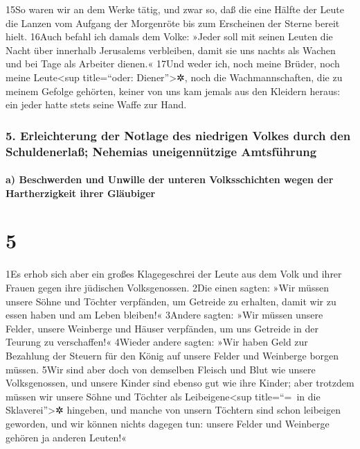 15So waren wir an dem Werke tätig, und zwar so, daß die eine Hälfte der
Leute die Lanzen vom Aufgang der Morgenröte bis zum Erscheinen der
Sterne bereit hielt. 16Auch befahl ich damals dem Volke: »Jeder soll mit
seinen Leuten die Nacht über innerhalb Jerusalems verbleiben, damit sie
uns nachts als Wachen und bei Tage als Arbeiter dienen.« 17Und weder
ich, noch meine Brüder, noch meine Leute\textless sup title=``oder:
Diener''\textgreater✲, noch die Wachmannschaften, die zu meinem Gefolge
gehörten, keiner von uns kam jemals aus den Kleidern heraus: ein jeder
hatte stets seine Waffe zur Hand.

\hypertarget{erleichterung-der-notlage-des-niedrigen-volkes-durch-den-schuldenerlauxdf-nehemias-uneigennuxfctzige-amtsfuxfchrung}{%
\subsubsection{5. Erleichterung der Notlage des niedrigen Volkes durch
den Schuldenerlaß; Nehemias uneigennützige
Amtsführung}\label{erleichterung-der-notlage-des-niedrigen-volkes-durch-den-schuldenerlauxdf-nehemias-uneigennuxfctzige-amtsfuxfchrung}}

\hypertarget{a-beschwerden-und-unwille-der-unteren-volksschichten-wegen-der-hartherzigkeit-ihrer-gluxe4ubiger}{%
\paragraph{a) Beschwerden und Unwille der unteren Volksschichten wegen
der Hartherzigkeit ihrer
Gläubiger}\label{a-beschwerden-und-unwille-der-unteren-volksschichten-wegen-der-hartherzigkeit-ihrer-gluxe4ubiger}}

\hypertarget{section-4}{%
\section{5}\label{section-4}}

1Es erhob sich aber ein großes Klagegeschrei der Leute aus dem Volk und
ihrer Frauen gegen ihre jüdischen Volksgenossen. 2Die einen sagten: »Wir
müssen unsere Söhne und Töchter verpfänden, um Getreide zu erhalten,
damit wir zu essen haben und am Leben bleiben!« 3Andere sagten: »Wir
müssen unsere Felder, unsere Weinberge und Häuser verpfänden, um uns
Getreide in der Teurung zu verschaffen!« 4Wieder andere sagten: »Wir
haben Geld zur Bezahlung der Steuern für den König auf unsere Felder und
Weinberge borgen müssen. 5Wir sind aber doch von demselben Fleisch und
Blut wie unsere Volksgenossen, und unsere Kinder sind ebenso gut wie
ihre Kinder; aber trotzdem müssen wir unsere Söhne und Töchter als
Leibeigene\textless sup title=``=~in die Sklaverei''\textgreater✲
hingeben, und manche von unsern Töchtern sind schon leibeigen geworden,
und wir können nichts dagegen tun: unsere Felder und Weinberge gehören
ja anderen Leuten!«

